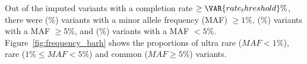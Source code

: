 
Out of the  imputed variants with a completion rate
$\geq \VAR{ rate_threshold }\%$, there were 
(\%) variants with a minor
allele frequency (MAF) $\geq 1\%$, 
(\%) variants with a MAF $\geq 5\%$, and
 (\%) variants with a MAF
$<5\%$.\\
 Figure~\ref{fig:frequency_barh} shows the proportions of ultra rare
($MAF<1\%$), rare ($1\%\leq MAF < 5\%$) and common ($MAF\geq 5\%$) variants.\\



